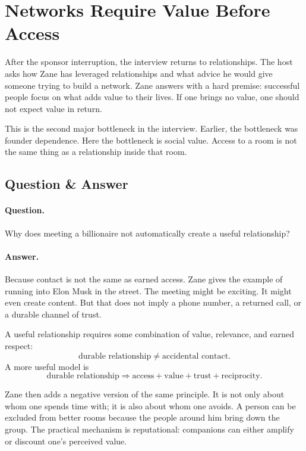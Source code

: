 \section{Networks Require Value Before Access}

After the sponsor interruption, the interview returns to relationships. The host asks how Zane has leveraged relationships and what advice he would give someone trying to build a network. Zane answers with a hard premise: successful people focus on what adds value to their lives. If one brings no value, one should not expect value in return.

This is the second major bottleneck in the interview. Earlier, the bottleneck was founder dependence. Here the bottleneck is social value. Access to a room is not the same thing as a relationship inside that room.

\subsection{Question \& Answer}

\paragraph{Question.}
Why does meeting a billionaire not automatically create a useful relationship?

\paragraph{Answer.}
Because contact is not the same as earned access. Zane gives the example of running into Elon Musk in the street. The meeting might be exciting. It might even create content. But that does not imply a phone number, a returned call, or a durable channel of trust.

A useful relationship requires some combination of value, relevance, and earned respect:
\begin{equation}
\text{durable relationship}
\neq
\text{accidental contact}.
\end{equation}
A more useful model is
\begin{equation}
\text{durable relationship}
\Rightarrow
\text{access}+\text{value}+\text{trust}+\text{reciprocity}.
\end{equation}

Zane then adds a negative version of the same principle. It is not only about whom one spends time with; it is also about whom one avoids. A person can be excluded from better rooms because the people around him bring down the group. The practical mechanism is reputational: companions can either amplify or discount one's perceived value.

